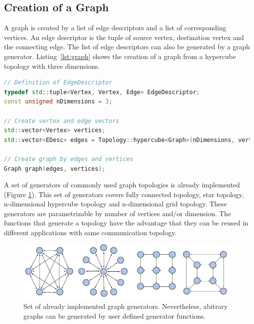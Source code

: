 \subsection{Creation of a Graph}
A graph is created by a list of edge descriptors and a list of
corresponding vertices. An edge descriptor is the tuple of source
vertex, destination vertex and the connecting edge. The list of edge
descriptors can also be generated by a graph
generator. Listing~\ref{lst:graph} shows the creation of a graph from
a hypercube topology with three dimensions.

\begin{lstlisting}[language=C++, label=lst:graph]
// Definition of EdgeDescriptor
typedef std::tuple<Vertex, Vertex, Edge> EdgeDescriptor;
const unsigned nDimensions = 3;

// Create vertex and edge vectors
std::vector<Vertex> vertices;
std::vector<EDesc> edges = Topology::hypercube<Graph>(nDimensions, vertices);

// Create graph by edges and vertices
Graph graph(edges, vertices);

\end{lstlisting}

\noindent A set of generators of commonly used graph topologies is already
implemented (Figure \ref{fig:topologies}).  This set of generators
covers fully connected topology, star topology, n-dimensional
hypercube topology and n-dimensional grid topology.  These generators
are parametrizable by number of vertices and/or dimension.  The
functions that generate a topology have the advantage that they can be
reused in different applications with same communication topology.

\begin{figure}[H]
  \centering
  \includegraphics[width=\textwidth]{graphics/40_topologies}
  \caption{Set of already implemented graph generators. Nevertheless,
  abitrary graphs can be generated by user defined generator functions.}
  \label{fig:topologies}
\end{figure}

